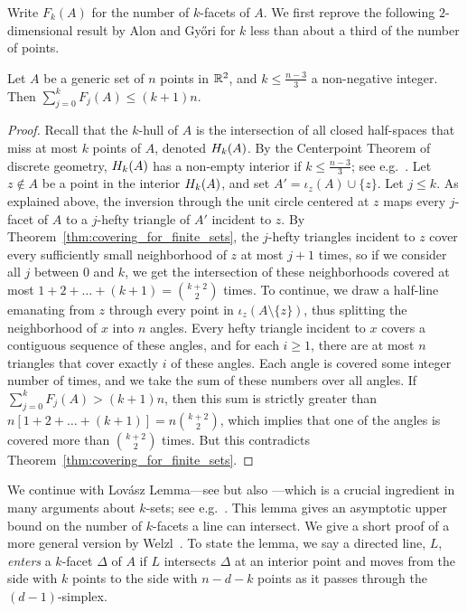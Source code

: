 \documentclass[a4paper,UKenglish,cleveref, autoref,numberwithinsect]{socg-lipics-v2021}
\newcommand {\mm}[1] {\ifmmode{#1}\else{\mbox{\(#1\)}}\fi}
\theoremstyle{plain}
\newcommand{\Rspace}        {\mm{{\mathbb R}}}
\newcommand{\Hull}[2]       {\mm{{H}_{#1}{({#2})}}}
\begin{document}
\smallskip
Write $F_k (A)$ for the number of $k$-facets of $A$.
We first reprove the following $2$-dimensional result by Alon and Gy\H{o}ri \cite{AlGy86} for $k$ less than about a third of the number of points.
\begin{proposition}
  \label{prop:at_most_k-sets}
  Let $A$ be a generic set of $n$ points in $\Rspace^2$, and $k \leq \frac{n-3}{3}$ a non-negative integer.
  Then $\sum_{j=0}^k F_j(A) \leq (k+1) n$.
\end{proposition}
\begin{proof}
  Recall that the $k$-hull of $A$ is the intersection of all closed half-spaces that miss at most $k$ points of $A$, denoted $\Hull{k}{A}$.
  By the Centerpoint Theorem of discrete geometry, $\Hull{k}{A}$ has a non-empty interior if $k \leq \frac{n-3}{3}$; see e.g.\ \cite[Section~4.1]{Ede87}.
  Let $z \not\in A$ be a point in the interior $\Hull{k}{A}$, and set $A' = \iota_z (A) \cup \{z\}$.
  Let $j \leq k$.
  As explained above, the inversion through the unit circle centered at $z$ maps every $j$-facet of $A$ to a $j$-hefty triangle of $A'$ incident to $z$.
  By Theorem~\ref{thm:covering_for_finite_sets}, the $j$-hefty triangles incident to $z$ cover every sufficiently small neighborhood of $z$ at most $j+1$ times, so if we consider all $j$ between $0$ and $k$, we get the intersection of these neighborhoods covered at most $1+2+\ldots+(k+1) = \binom{k+2}{2}$ times.
  \smallskip
  To continue, we draw a half-line emanating from $z$ through every point in $\iota_z (A \setminus \{z\})$, thus splitting the neighborhood of $x$ into $n$ angles.
  Every hefty triangle incident to $x$ covers a contiguous sequence of these angles, and for each $i \geq 1$, there are at most $n$ triangles that cover exactly $i$ of these angles.
  Each angle is covered some integer number of times, and we take the sum of these numbers over all angles.
  If $\sum_{j=0}^k F_j(A) > (k+1)n$, then this sum is strictly greater than $n [1+2+\ldots+(k+1)] = n \binom{k+2}{2}$, which implies that one of the angles is covered more than $\binom{k+2}{2}$ times.
  But this contradicts Theorem~\ref{thm:covering_for_finite_sets}.
\end{proof}
We continue with Lov\'{a}sz Lemma---see \cite{BFL90} but also \cite[Lemma~11.3.2]{Mat02}---which is a crucial ingredient in many arguments about $k$-sets; see e.g.\ \cite{Rub24}.
This lemma gives an asymptotic upper bound on the number of $k$-facets a line can intersect.
We give a short proof of a more general version by Welzl~\cite{Wel01}.
To state the lemma, we say a directed line, $L$, \emph{enters} a $k$-facet $\Delta$ of $A$ if $L$ intersects $\Delta$ at an interior point and moves from the side with $k$ points to the side with $n-d-k$ points as it passes through the $(d-1)$-simplex.
\end{document}
